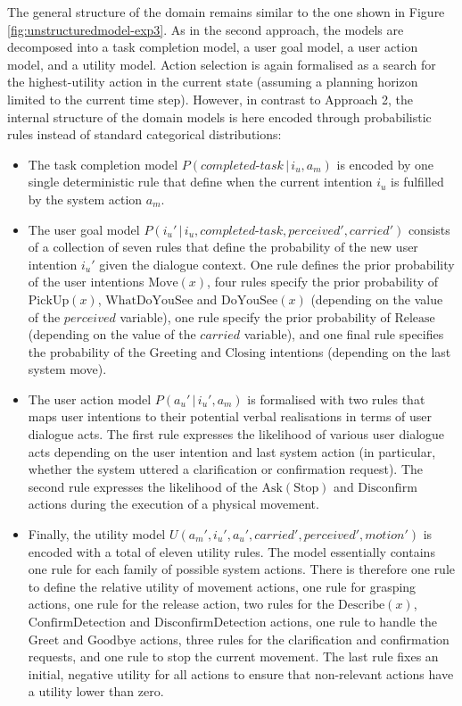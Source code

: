 The general structure of the domain remains similar to the one shown in Figure \ref{fig:unstructuredmodel-exp3}.  As in the second approach, the models are decomposed into a task completion model, a user goal model, a user action model, and a utility model.  Action selection is again formalised as a search for the highest-utility action in the current state (assuming a planning horizon limited to the current time step).  However, in contrast to Approach 2, the internal structure of the domain models is here encoded through probabilistic rules instead of standard categorical distributions:
\begin{itemize}
\item The task completion model $P(\mathit{completed\mbox{-}task}\, | \, i_u, a_m)$ is encoded by one single deterministic rule that define when the current intention $i_u$ is fulfilled by the system action $a_m$. 
\item The user goal model $P(i_u' \, | \, i_u, \mathit{completed\mbox{-}task}, \mathit{perceived'}, \mathit{carried'})$ consists of a collection of seven rules that define the probability of the new user intention $i_u'$ given the dialogue context. One rule defines the prior probability of the user intentions $\mathrm{Move(\mathit{x})}$, four rules specify the prior probability of $\mathrm{PickUp(\mathit{x})}$, $\mathrm{WhatDoYouSee}$ and $\mathrm{DoYouSee(\mathit{x})}$ (depending on the value of the $\mathit{perceived}$ variable), one rule specify the prior probability of $\mathrm{Release}$ (depending on the value of the $\mathit{carried}$ variable), and one final rule specifies the probability of the $\mathrm{Greeting}$ and $\mathrm{Closing}$ intentions (depending on the last system move). 

\item The user action model $P(a_u'\, | \, i_u', a_m)$ is formalised with two rules that maps user intentions to their potential verbal realisations in terms of user dialogue acts. The first rule expresses the likelihood of various user dialogue acts depending on the user intention and last system action (in particular, whether the system uttered a clarification or confirmation request).  The second rule expresses the likelihood of the $\mathrm{Ask(Stop)}$ and $\mathrm{Disconfirm}$ actions during the execution of a physical movement.

\item Finally, the utility model $U(a_m', i_u', a_u', \mathit{carried'}, \mathit{perceived'}, \mathit{motion'})$ is encoded with a total of eleven utility rules.  The model essentially contains one rule for each family of possible system actions.  There is therefore one rule to define the relative utility of movement actions, one rule for grasping actions, one rule for the release action, two rules for the $\mathrm{Describe(\mathit{x})}$, $\mathrm{ConfirmDetection}$ and $\mathrm{DisconfirmDetection}$ actions, one rule to handle the  $\mathrm{Greet}$ and $\mathrm{Goodbye}$ actions, three rules for the clarification and confirmation requests, and one rule to stop the current movement. The last rule fixes an initial, negative utility for all actions to ensure that non-relevant actions have a utility lower than zero.  


\end{itemize}
